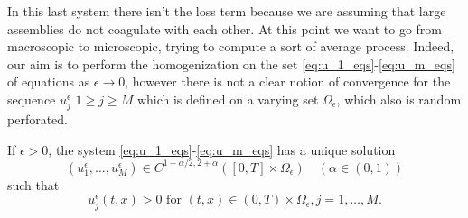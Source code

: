 In this last system there isn't the loss term because we are assuming that large assemblies do not coagulate with each other.
At this point we want to go from macroscopic to microscopic, trying to compute a sort of average process. Indeed, our aim is to perform the homogenization on the set \eqref{eq:u_1_eqs}-\eqref{eq:u_m_eqs} of equations as $\epsilon \rightarrow 0$, however there is not a clear notion of convergence for the sequence $u_j^{\epsilon}$ $1\geq j \geq M$ which is defined on a varying set $\Omega_{\epsilon}$, which also is random perforated.

\begin{theorem} 
    If $\epsilon>0$, the system \eqref{eq:u_1_eqs}-\eqref{eq:u_m_eqs} has a unique solution
    $$
    \left(u_{1}^{\epsilon}, \ldots, u_{M}^{\epsilon}\right) \in C^{1+\alpha / 2,2+\alpha}\left([0, T] \times \Omega_{\epsilon}\right) \quad(\alpha \in(0,1))
    $$
    such that
    $$
    u_{j}^{\epsilon}(t, x)>0 \text { for }(t, x) \in(0, T) \times \Omega_{\epsilon}, j=1, \ldots, M .
    $$
    \label{thm:3.1}
\end{theorem}
